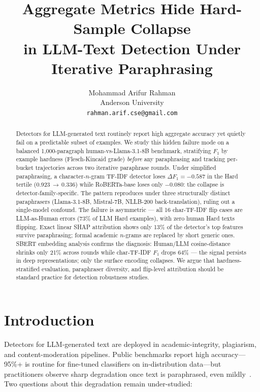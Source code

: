 \documentclass[11pt,a4paper]{article}
\title{\textbf{Aggregate Metrics Hide Hard-Sample Collapse \\
       in LLM-Text Detection Under Iterative Paraphrasing}}
\author{Mohammad Arifur Rahman \\
        Anderson University \\
        \texttt{rahman.arif.cse@gmail.com}}
\date{}
\begin{document}
\maketitle

\begin{abstract}
Detectors for LLM-generated text routinely report high aggregate accuracy
yet quietly fail on a predictable subset of examples. We study this hidden
failure mode on a balanced 1{,}000-paragraph human-vs-Llama-3.1-8B
benchmark, stratifying $F_1$ by example hardness (Flesch-Kincaid grade)
\emph{before} any paraphrasing and tracking per-bucket trajectories across
two iterative paraphrase rounds. Under simplified paraphrasing, a
character-$n$-gram TF-IDF detector loses
$\Delta F_1 = -0.587$ in the Hard tertile (0.923\,$\to$\,0.336) while
RoBERTa-base loses only $-0.080$: the collapse is
detector-family-specific. The pattern reproduces under three structurally
distinct paraphrasers (Llama-3.1-8B, Mistral-7B, NLLB-200 back-translation),
ruling out a single-model confound. The failure is asymmetric — all 16
char-TF-IDF flip cases are LLM-as-Human errors (73\% of LLM Hard examples),
with zero human Hard texts flipping. Exact linear SHAP attribution shows
only 13\% of the detector's top features survive paraphrasing; formal
academic $n$-grams are replaced by short generic ones. SBERT embedding
analysis confirms the diagnosis: Human/LLM cosine-distance shrinks only
21\% across rounds while char-TF-IDF $F_1$ drops 64\% — the signal persists
in deep representations; only the surface encoding collapses. We argue that
hardness-stratified evaluation, paraphraser diversity, and flip-level
attribution should be standard practice for detection robustness studies.
\end{abstract}

\section{Introduction}

Detectors for LLM-generated text are deployed in academic-integrity,
plagiarism, and content-moderation pipelines.
Public benchmarks report high accuracy—95\%+ is routine for fine-tuned
classifiers on in-distribution data—but practitioners observe sharp
degradation once text is paraphrased, even
mildly~\citep{krishna2023paraphrasing,sadasivan2023can}.
Two questions about this degradation remain under-studied:
\end{document}
